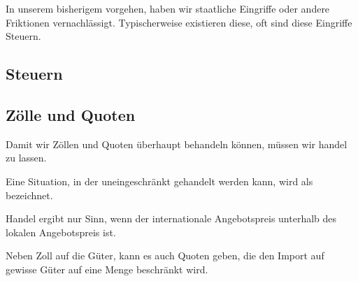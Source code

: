 In unserem bisherigem vorgehen, haben wir staatliche Eingriffe oder andere Friktionen vernachlässigt.
Typischerweise existieren diese, oft sind diese Eingriffe Steuern.

\subsection{Steuern}



\subsection{Zölle und Quoten}

Damit wir Zöllen und Quoten überhaupt behandeln können, müssen wir handel zu lassen.


\begin{definition} 
	Eine Situation, in der uneingeschränkt gehandelt werden kann, wird als
	 bezeichnet.
\end{definition}

Handel ergibt nur Sinn, wenn der internationale Angebotspreis unterhalb des lokalen Angebotspreis ist.


Neben Zoll auf die Güter, kann es auch Quoten geben, die den Import auf gewisse Güter auf eine Menge beschränkt wird.
